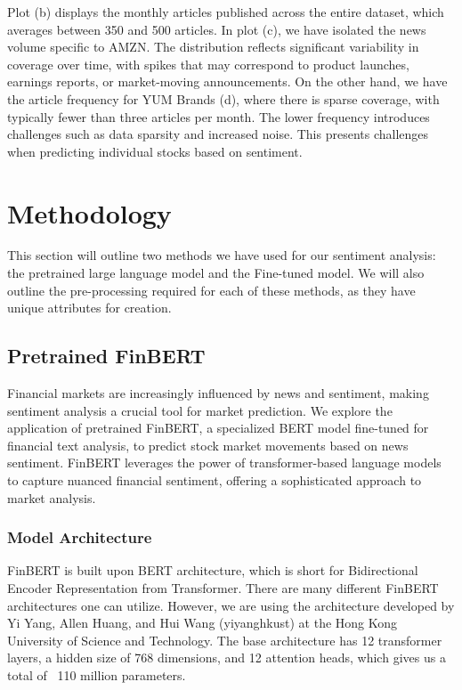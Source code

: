 \documentclass[12pt]{article}
\begin{document}
Plot (b) displays the monthly articles published across the entire dataset, which averages between 350 and 500 articles. In plot (c), we have isolated the news volume specific to AMZN. The distribution reflects significant variability in coverage over time, with spikes that may correspond to product launches, earnings reports, or market-moving announcements. On the other hand, we have the article frequency for YUM Brands (d), where there is sparse coverage, with typically fewer than three articles per month. The lower frequency introduces challenges such as data sparsity and increased noise. This presents challenges when predicting individual stocks based on sentiment.


\section*{Methodology}

This section will outline two methods we have used for our sentiment analysis: the pretrained large language model and the Fine-tuned model. We will also outline the pre-processing required for each of these methods, as they have unique attributes for creation.

\subsection*{Pretrained FinBERT}

Financial markets are increasingly influenced by news and sentiment, making sentiment analysis a crucial tool for market prediction. We explore the application of pretrained FinBERT, a specialized BERT model fine-tuned for financial text analysis, to predict stock market movements based on news sentiment. FinBERT leverages the power of transformer-based language models to capture nuanced financial sentiment, offering a sophisticated approach to market analysis.

\subsubsection*{Model Architecture}

FinBERT is built upon BERT architecture, which is short for Bidirectional Encoder Representation from Transformer. There are many different FinBERT architectures one can utilize. However, we are using the architecture developed by Yi Yang, Allen Huang, and Hui Wang (yiyanghkust) at the Hong Kong University of Science and Technology. The base architecture has 12 transformer layers, a hidden size of 768 dimensions, and 12 attention heads, which gives us a total of ~110 million parameters.
\end{document}
